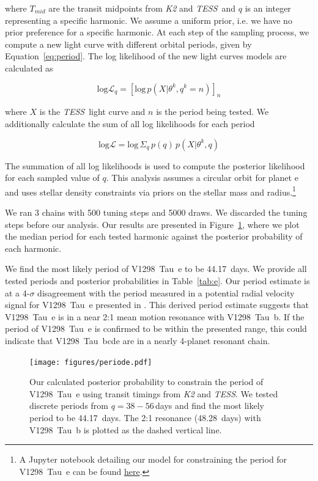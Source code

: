 \documentclass[twocolumn]{aastex631}
\newcommand{\githubicon}{{\color{black}\faGithub}}
\newcommand{\tess}{\textit{TESS}}
\newcommand{\allplanets}{V1298~Tau~bcde\xspace}
\newcommand{\planetb}{V1298~Tau~b\xspace}
\newcommand{\planete}{V1298~Tau~e\xspace}
\begin{document}
where $T_{mid}$ are the transit midpoints from \textit{K2} and \tess\ and $q$ is an integer representing a specific harmonic. We assume a uniform prior, i.e. we have no prior preference for a specific harmonic. At each step of the sampling process, we compute a new light curve with different orbital periods, given by Equation~\ref{eq:period}. The log likelihood of the new light curves models are calculated as

\begin{equation}
    \textrm{log} \mathcal{L}_q = \left[ \textrm{log}\, p \left( X | \theta^k, q^k = n \right) \right]_n
\end{equation}

where $X$ is the \tess\ light curve and $n$ is the period being tested. We additionally calculate the sum of all log likelihoods for each period 

\begin{equation}
    \textrm{log} \mathcal{L} = \textrm{log}\, \Sigma_q\, p(q)\, p(X|\theta^k, q) 
\end{equation}

The summation of all log likelihoods is used to compute the posterior likelihood for each sampled value of $q$. This analysis assumes a circular orbit for planet e and uses stellar density constraints via priors on the stellar mass and radius.\footnote{A Jupyter notebook detailing our model for constraining the period for \planete can be found \href{https://github.com/afeinstein20/v1298tau\_tess/blob/main/notebooks/V1298Tau\_e.ipynb}{here}.}

We ran 3 chains with 500 tuning steps and 5000 draws. We discarded the tuning steps before our analysis. Our results are presented in Figure~\ref{fig:period_e}, where we plot the median period for each tested harmonic against the posterior probability of each harmonic.

We find the most likely period of \planete to be 44.17~days. We provide all tested periods and posterior probabilities in Table~\ref{tab:e}. Our period estimate is at a 4-$\sigma$ disagreement with the period measured in a potential radial velocity signal for \planete presented in \cite{suarez21}. This derived period estimate suggests that \planete is in a near 2:1 mean motion resonance with \planetb. If the period of \planete is confirmed to be within the presented range, this could indicate that \allplanets are in a nearly 4-planet resonant chain.

\begin{figure}[h]
\begin{center}
\texttt{[image: figures/periode.pdf]}
\caption{Our calculated posterior probability to constrain the period of \planete using transit timings from \textit{K2} and \tess. We tested discrete periods from $q=38-56$\,days and find the most likely period to be 44.17~days. The 2:1 resonance (48.28~days) with \planetb is plotted as the dashed vertical line. \href{https://github.com/afeinstein20/v1298tau\_tess/blob/main/src/figures/period\_e.py}{\githubicon}} \label{fig:period_e}
\end{center}
\end{figure}
\end{document}
